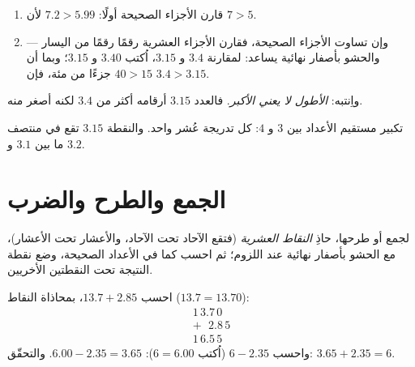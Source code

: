 \begin{method}\label{met:g6:decimals:compare}
\begin{enumerate}
  \item قارن الأجزاء الصحيحة أولًا: $7.2 > 5.99$ لأن $7 > 5$.
  \item وإن تساوت الأجزاء الصحيحة، فقارن الأجزاء العشرية رقمًا
        رقمًا من اليسار --- والحشو بأصفار نهائية يساعد:
        لمقارنة $3.4$ و $3.15$، اُكتب $3.40$ و $3.15$؛
        وبما أن $40 > 15$ جزءًا من مئة، فإن $3.4 > 3.15$.
\end{enumerate}
واِنتبه: \emph{الأطول لا يعني الأكبر}. فالعدد $3.15$ أرقامه أكثر من
$3.4$ لكنه أصغر منه.
\end{method}

\begin{omfigure}

{\small تكبير مستقيم الأعداد بين $3$ و $4$: كل تدريجة عُشر
واحد. والنقطة $3.15$ تقع في منتصف ما بين $3.1$ و $3.2$.}
\end{omfigure}

\section{الجمع والطرح والضرب}

\begin{method}\label{met:g6:decimals:columns}
لجمع  أو طرحها، حاذِ \emph{النقاط العشرية}
(فتقع الآحاد تحت الآحاد، والأعشار تحت الأعشار)، مع الحشو بأصفار
نهائية عند اللزوم؛ ثم احسب كما في الأعداد الصحيحة، وضع نقطة
النتيجة تحت النقطتين الأخريين.
\end{method}

\begin{example}\label{ex:g6:decimals:addsub}
احسب $13.7 + 2.85$، بمحاذاة النقاط ($13.7 = 13.70$):
\[
\begin{array}{r}
1\,3.7\,0 \\
+\ \ \,2.8\,5 \\
\hline
1\,6.5\,5
\end{array}
\]
واحسب $6 - 2.35$ (اُكتب $6 = 6.00$):
$6.00 - 2.35 = 3.65$. والتحقّق: $3.65 + 2.35 = 6$.
\end{example}

